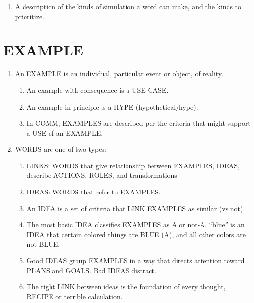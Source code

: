 \documentclass[
]{book}
\providecommand{\tightlist}{%
  \setlength{\itemsep}{0pt}\setlength{\parskip}{0pt}}
\begin{document}
\begin{enumerate}
\def\labelenumi{\arabic{enumi}.}
\setcounter{enumi}{46}
\tightlist
\item
  A description of the kinds of simulation a word can make, and the
  kinds to prioritize.
\end{enumerate}

\hypertarget{example}{%
\section{EXAMPLE}\label{example}}

\begin{enumerate}
\def\labelenumi{\arabic{enumi}.}
\setcounter{enumi}{44}
\tightlist
\item
  An EXAMPLE is an individual, particular event or object, of reality.

  \begin{enumerate}
  \def\labelenumii{\arabic{enumii}.}
  \tightlist
  \item
    An example with consequence is a USE-CASE.
  \item
    An example in-principle is a HYPE (hypothetical/hype).
  \item
    In COMM, EXAMPLES are described per the criteria that might
    support a USE of an EXAMPLE.
  \end{enumerate}
\item
  WORDS are one of two types:

  \begin{enumerate}
  \def\labelenumii{\arabic{enumii}.}
  \tightlist
  \item
    LINKS: WORDS that give relationship between EXAMPLES, IDEAS,
    describe ACTIONS, ROLES, and transformations.
  \item
    IDEAS: WORDS that refer to EXAMPLES.
  \item
    An IDEA is a set of criteria that LINK EXAMPLES as similar (vs
    not).
  \item
    The most basic IDEA classifies EXAMPLES as A or not-A. ``blue'' is
    an IDEA that certain colored things are BLUE (A), and all other
    colors are not BLUE.
  \item
    Good IDEAS group EXAMPLES in a way that directs attention toward
    PLANS and GOALS. Bad IDEAS distract.
  \item
    The right LINK between ideas is the foundation of every thought,
    RECIPE or terrible calculation.
  \end{enumerate}
\end{enumerate}
\end{document}
